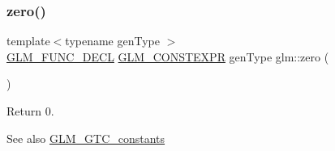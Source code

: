 \subsubsection{\texorpdfstring{zero()}{zero()}}
{\footnotesize\ttfamily template$<$typename gen\+Type $>$ \\
\mbox{\hyperlink{setup_8hpp_ab2d052de21a70539923e9bcbf6e83a51}{G\+L\+M\+\_\+\+F\+U\+N\+C\+\_\+\+D\+E\+CL}} \mbox{\hyperlink{setup_8hpp_a08b807947b47031d3a511f03f89645ad}{G\+L\+M\+\_\+\+C\+O\+N\+S\+T\+E\+X\+PR}} gen\+Type glm\+::zero (\begin{DoxyParamCaption}{ }\end{DoxyParamCaption})}

Return 0. \begin{DoxySeeAlso}{See also}
\mbox{\hyperlink{group__gtc__constants}{G\+L\+M\+\_\+\+G\+T\+C\+\_\+constants}} 
\end{DoxySeeAlso}

